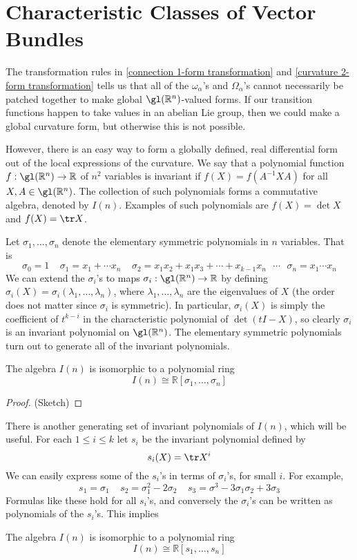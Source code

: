 \section{Characteristic Classes of Vector Bundles}


The transformation rules in \eqref{connection 1-form transformation} and \eqref{curvature 2-form transformation} tells us that all of the $\omega_\alpha$'s and $\Omega_\alpha$'s cannot necessarily be patched together to make global $\gl(\mathbb R^n)$-valued forms. If our transition functions happen to take values in an abelian Lie group, then we could make a global curvature form, but otherwise this is not possible.

However, there is an easy way to form a globally defined, real differential form out of the local expressions of the curvature. We say that a polynomial function $f : \gl(\mathbb R^n) \rightarrow \mathbb R$ of $n^2$ variables is invariant if $f(X) = f(A^{-1}XA)$ for all $X,A \in \gl(\mathbb R^n)$. The collection of such polynomials forms a commutative algebra, denoted by $I(n)$. Examples of such polynomials are $f(X) = \det X$ and $f(X) = \tr X$. 

Let $\sigma_1,\ldots,\sigma_n$ denote the elementary symmetric polynomials in $n$ variables. That is
\[ \sigma_0 = 1 \ \ \ \ \ \sigma_1 = x_1 + \cdots x_n \ \ \ \ \ \sigma_2 = x_1x_2 + x_1x_3 + \cdots + x_{k-1}x_n \ \ \ \cdots \ \ \ \sigma_n = x_1 \cdots x_n \]
We can extend the $\sigma_i$'s to maps $\sigma_i : \gl(\mathbb R^n) \rightarrow \mathbb R$ by defining $\sigma_i(X) = \sigma_i(\lambda_1,\ldots,\lambda_n)$, where $\lambda_1,\ldots,\lambda_n$ are the eigenvalues of $X$ (the order does not matter since $\sigma_i$ is symmetric). In particular, $\sigma_i(X)$ is simply the coefficient of $t^{k-i}$ in the characteristic polynomial of $\det(tI - X)$, so clearly $\sigma_i$ is an invariant polynomial on $\gl(\mathbb R^n)$. The elementary symmetric polynomials turn out to generate all of the invariant polynomials.
\begin{prop}
The algebra $I(n)$ is isomorphic to a polynomial ring
\[ I(n) \cong \mathbb R[\sigma_1,\ldots,\sigma_n] \]
\end{prop}
\begin{proof}(Sketch)
\end{proof}

There is another generating set of invariant polynomials of $I(n)$, which will be useful. For each $1 \leq i \leq k$ let $s_i$ be the invariant polynomial defined by
\[ s_i(X) = \tr X^i \]
We can easily express some of the $s_i$'s in terms of $\sigma_i$'s, for small $i$. For example, 
\[ s_1 = \sigma_1 \ \ \ \ \ s_2 = \sigma_1^2 - 2\sigma_2 \ \ \ \ \ s_3 = \sigma^3 - 3\sigma_1\sigma_2 + 3\sigma_3 \]
Formulas like these hold for all $s_i$'s, and conversely the $\sigma_i$'s can be written as polynomials of the $s_i$'s. This implies 
\begin{prop}
The algebra $I(n)$ is isomorphic to a polynomial ring
\[ I(n) \cong \mathbb R[s_1,\ldots,s_n] \]
\end{prop}






